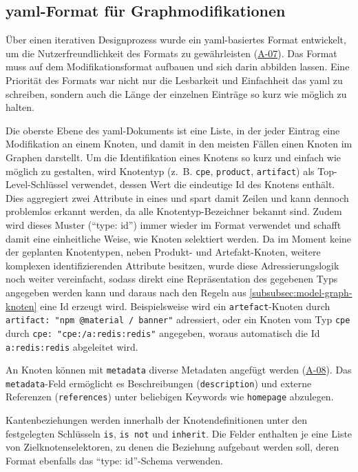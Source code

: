 \subsection{\acrshort{yaml}-Format für Graphmodifikationen}\label{subsec:modell-graph-modification-yaml}

Über einen iterativen Designprozess wurde ein \acrshort{yaml}-basiertes Format entwickelt, um die Nutzerfreundlichkeit des Formats zu gewährleisten (\hyperref[subsec:req-manual-format-modification]{A-07}).
Das Format muss auf dem Modifikationsformat aufbauen und sich darin abbilden lassen.
Eine Priorität des Formats war nicht nur die Lesbarkeit und Einfachheit das \acrshort{yaml} zu schreiben, sondern auch die Länge der einzelnen Einträge so kurz wie möglich zu halten.

Die oberste Ebene des \acrshort{yaml}-Dokuments ist eine Liste, in der jeder Eintrag eine Modifikation an einem Knoten, und damit in den meisten Fällen einen Knoten im Graphen darstellt.
Um die Identifikation eines Knotens so kurz und einfach wie möglich zu gestalten, wird Knotentyp (z.\ B. \texttt{cpe}, \texttt{product}, \texttt{artifact}) als Top-Level-Schlüssel verwendet, dessen Wert die eindeutige Id des Knotens enthält.
Dies aggregiert zwei Attribute in eines und spart damit Zeilen und kann dennoch problemlos erkannt werden, da alle Knotentyp-Bezeichner bekannt sind.
Zudem wird dieses Muster (\enquote{type: id}) immer wieder im Format verwendet und schafft damit eine einheitliche Weise, wie Knoten selektiert werden.
Da im Moment keine der geplanten Knotentypen, neben Produkt- und Artefakt-Knoten, weitere komplexen identifizierenden Attribute besitzen, wurde diese Adressierungslogik noch weiter vereinfacht, sodass direkt eine Repräsentation des gegebenen Typs angegeben werden kann und daraus nach den Regeln aus \autoref{subsubsec:model-graph-knoten} eine Id erzeugt wird.
Beispielsweise wird ein \texttt{artefact}-Knoten durch \texttt{artifact: "npm @material / banner"} adressiert, oder ein Knoten vom Typ \texttt{cpe} durch \texttt{cpe: "cpe:/a:redis:redis"} angegeben, woraus automatisch die Id \texttt{a:redis:redis} abgeleitet wird.

An Knoten können mit \texttt{metadata} diverse Metadaten angefügt werden (\hyperref[subsec:req-reason-format]{A-08}).
Das \texttt{metadata}-Feld ermöglicht es Beschreibungen (\texttt{description}) und externe Referenzen (\texttt{references}) unter beliebigen Keywords wie \texttt{homepage} abzulegen.

Kantenbeziehungen werden innerhalb der Knotendefinitionen unter den festgelegten Schlüsseln \texttt{is}, \texttt{is not} und \texttt{inherit}.
Die Felder enthalten je eine Liste von Zielknotenselektoren, zu denen die Beziehung aufgebaut werden soll, deren Format ebenfalls das \enquote{type: id}-Schema verwenden.


